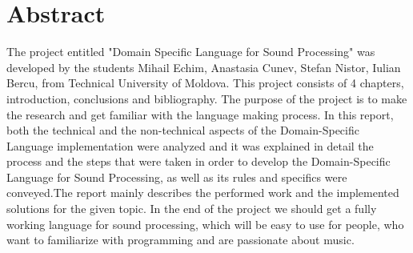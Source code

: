 \chapter*{Abstract}

\par The project entitled "Domain Specific Language for Sound 
Processing" was developed by the students Mihail Echim, Anastasia 
Cunev, Stefan Nistor, Iulian Bercu, from Technical University of 
Moldova. This project consists of 4 chapters, introduction, 
conclusions and bibliography. The purpose of the project is to make the research and get familiar with the language making process. In this report, both the technical and the non-technical aspects of the Domain-Specific Language implementation were analyzed and it was explained in detail the process and the steps that were taken in order to develop the Domain-Specific Language for Sound Processing, as well as its rules and specifics were conveyed.The report mainly describes the performed work and the implemented solutions for the given topic. In the end of the project we should get a fully working language for sound processing, which will be easy to use for people, who want to familiarize with programming and are passionate about music. 


\clearpage